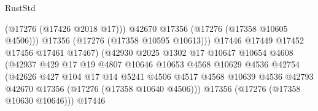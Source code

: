 \begin{lexlean}{RustStd}
\begin{coremodule}
                                                  (@17276 (@17426 @2018 @17)))
                                                @42670
                                                @17356
                                                (@17276 (@17358 @10605 @4506)))
                                              @17356
                                              (@17276 (@17358 @10595 @10613)))
                                            @17446
                                            @17449
                                            @17452
                                            @17456
                                            @17461
                                            @17467)
                                          (@42930
                                            @2025
                                            @1302
                                            @17
                                            @10647
                                            @10654
                                            @4608
                                            (@42937
                                              @429
                                              @17
                                              @19
                                              @4807
                                              @10646
                                              @10653
                                              @4568
                                              @10629
                                              @4536
                                              @42754
                                              (@42626
                                                @427
                                                @104
                                                @17
                                                @14
                                                @5241
                                                @4506
                                                @4517
                                                @4568
                                                @10639
                                                @4536
                                                @42793
                                                @42670
                                                @17356
                                                (@17276 (@17358 @10640 @4506)))
                                              @17356
                                              (@17276 (@17358 @10630 @10646)))
                                            @17446

\end{coremodule}
\end{lexlean}
